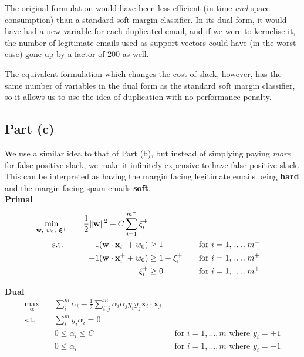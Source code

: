 The original formulation would have been less efficient (in time \textit{and} space consumption) than a standard soft margin classifier. In its dual form, it would have had a new variable for each duplicated email, and if we were to kernelise it, the number of legitimate emails used as support vectors could have (in the worst case) gone up by a factor of 200 as well.

The equivalent formulation which changes the cost of slack, however, has the same number of variables in the dual form as the standard soft margin classifier, so it allows us to use the idea of duplication with no performance penalty.

\subsection{Part (c)}
We use a similar idea to that of Part (b), but instead of simplying paying \textit{more} for false-positive slack, we make it infinitely expensive to have false-positive slack. This can be interpreted as having the margin facing legitimate emails being \textbf{hard} and the margin facing spam emails \textbf{soft}.\\[1em]

\noindent\textbf{Primal}
\begin{alignat*}{3}
  \min_{\mathbf{w},~w_0,~\boldsymbol\xi^+}\quad&&\frac{1}{2}\lVert\mathbf{w}\rVert^2 + C\sum_{i=1}^{m^+}\xi_i^+\\
  \text{s.t. }\quad&&-1(\mathbf{w}\cdot\mathbf{x}_i^-+w_0) & \geq 1 &&\quad\text{for }i = 1,\ldots,m^-
  \\ &&+1(\mathbf{w}\cdot\mathbf{x}_i^++w_0) & \geq 1 - \xi_i^+ &&\quad\text{for }i = 1,\ldots,m^+
  \\ &&\xi_i^+ & \geq 0 &&\quad\text{for }i=1,\ldots,m^+
\end{alignat*}

\noindent\textbf{Dual}
\begin{align*}
  \max_{\boldsymbol\alpha}\quad&\sum_{i}^m\alpha_i-\frac{1}{2}\sum_{i,j}^{m}\alpha_i\alpha_jy_iy_j\mathbf{x}_i\cdot\mathbf{x}_j\\
  \text{s.t.}\quad&\sum_i^my_i\alpha_i = 0
  \\ & 0\leq\alpha_i\leq C && \text{for }i=1,\ldots,m\text{ where }y_i=+1
  \\ & 0\leq\alpha_i &&\text{for }i=1,\ldots,m\text{ where }y_i=-1
\end{align*}

